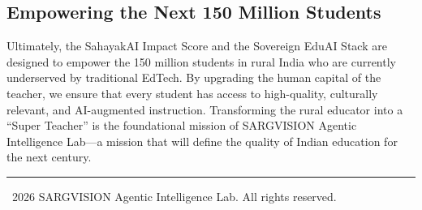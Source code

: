 \documentclass[11pt,a4paper]{article}
\begin{document}
\subsection{Empowering the Next 150 Million Students}
Ultimately, the SahayakAI Impact Score and the Sovereign EduAI Stack are designed to empower the 150 million students in rural India who are currently underserved by traditional EdTech. By upgrading the human capital of the teacher, we ensure that every student has access to high-quality, culturally relevant, and AI-augmented instruction. Transforming the rural educator into a ``Super Teacher'' is the foundational mission of SARGVISION Agentic Intelligence Lab---a mission that will define the quality of Indian education for the next century.

\bigskip
\hrule
\vspace{0.5cm}
\noindent \footnotesize \textcopyright\ 2026 SARGVISION Agentic Intelligence Lab. All rights reserved.
\end{document}
